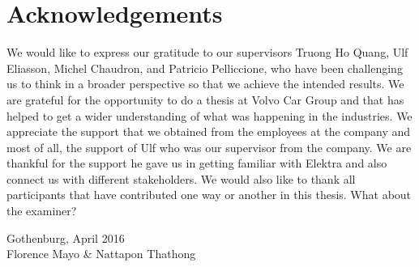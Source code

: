 \thispagestyle{plain}			%

\section*{Acknowledgements}
We would like to express our gratitude to our supervisors Truong Ho Quang, Ulf Eliasson, Michel Chaudron, and Patricio Pelliccione, who have been challenging us to think in a broader perspective so that we achieve the intended results. We are grateful for the opportunity to do a thesis at Volvo Car Group and that has helped to get a wider understanding of what was happening in the industries. We appreciate the support that we obtained from the employees at the company and most of all, the support of Ulf who was our supervisor from the company. We are thankful for the support he gave us in getting familiar with Elektra and also connect us with different stakeholders.
We would also like to thank all participants that have contributed one way or another in this thesis.
What about the examiner?

\vspace{1.5cm}
\hfill
\begin{flushright}Gothenburg, April 2016\\
Florence Mayo \& Nattapon Thathong
\end{flushright}

\thispagestyle{empty}
\mbox{}